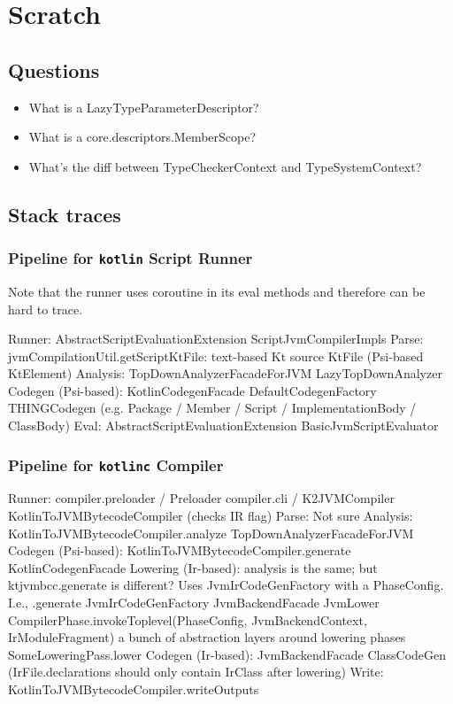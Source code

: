 \documentclass{article}
\begin{document}
\section{Scratch}

\subsection{Questions}

\begin{itemize}
    \item What is a LazyTypeParameterDescriptor?
    \item What is a core.descriptors.MemberScope?
    \item What's the diff between TypeCheckerContext and TypeSystemContext?
\end{itemize}

\subsection{Stack traces}

\subsubsection{Pipeline for \texttt{kotlin} Script Runner}
Note that the runner uses coroutine in its eval methods and therefore can be hard to trace.

Runner: AbstractScriptEvaluationExtension \textSafeTo ScriptJvmCompilerImpls
Parse: jvmCompilationUtil.getScriptKtFile: text-based Kt source \textSafeTo KtFile (Psi-based KtElement)
Analysis: TopDownAnalyzerFacadeForJVM \textSafeTo LazyTopDownAnalyzer
Codegen (Psi-based): KotlinCodegenFacade \textSafeTo DefaultCodegenFactory \textSafeTo THINGCodegen (e.g. Package / Member / Script / ImplementationBody / ClassBody)
Eval: AbstractScriptEvaluationExtension \textSafeTo BasicJvmScriptEvaluator

\subsubsection{Pipeline for \texttt{kotlinc} Compiler}

 Runner: compiler.preloader / Preloader \textSafeTo compiler.cli / K2JVMCompiler \textSafeTo KotlinToJVMBytecodeCompiler (checks IR flag)
Parse: Not sure
Analysis: KotlinToJVMBytecodeCompiler.analyze \textSafeTo TopDownAnalyzerFacadeForJVM
Codegen (Psi-based): KotlinToJVMBytecodeCompiler.generate \textSafeTo KotlinCodegenFacade
Lowering (Ir-based): analysis is the same; but ktjvmbcc.generate is different? Uses JvmIrCodeGenFactory with a PhaseConfig. I.e., .generate \textSafeTo JvmIrCodeGenFactory \textSafeTo JvmBackendFacade \textSafeTo JvmLower \textSafeTo CompilerPhase.invokeToplevel(PhaseConfig, JvmBackendContext, IrModuleFragment) \textSafeTo a bunch of abstraction layers around lowering phases \textSafeTo SomeLoweringPass.lower
Codegen (Ir-based): JvmBackendFacade \textSafeTo ClassCodeGen (IrFile.declarations should only contain IrClass after lowering)
Write: KotlinToJVMBytecodeCompiler.writeOutputs
\end{document}
